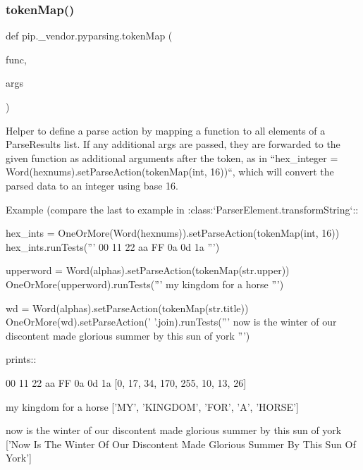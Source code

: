 \subsubsection{\texorpdfstring{token\+Map()}{tokenMap()}}
{\footnotesize\ttfamily def pip.\+\_\+vendor.\+pyparsing.\+token\+Map (\begin{DoxyParamCaption}\item[{}]{func,  }\item[{}]{args }\end{DoxyParamCaption})}

\begin{DoxyVerb}Helper to define a parse action by mapping a function to all
elements of a ParseResults list. If any additional args are passed,
they are forwarded to the given function as additional arguments
after the token, as in
``hex_integer = Word(hexnums).setParseAction(tokenMap(int, 16))``,
which will convert the parsed data to an integer using base 16.

Example (compare the last to example in :class:`ParserElement.transformString`::

    hex_ints = OneOrMore(Word(hexnums)).setParseAction(tokenMap(int, 16))
    hex_ints.runTests('''
        00 11 22 aa FF 0a 0d 1a
        ''')

    upperword = Word(alphas).setParseAction(tokenMap(str.upper))
    OneOrMore(upperword).runTests('''
        my kingdom for a horse
        ''')

    wd = Word(alphas).setParseAction(tokenMap(str.title))
    OneOrMore(wd).setParseAction(' '.join).runTests('''
        now is the winter of our discontent made glorious summer by this sun of york
        ''')

prints::

    00 11 22 aa FF 0a 0d 1a
    [0, 17, 34, 170, 255, 10, 13, 26]

    my kingdom for a horse
    ['MY', 'KINGDOM', 'FOR', 'A', 'HORSE']

    now is the winter of our discontent made glorious summer by this sun of york
    ['Now Is The Winter Of Our Discontent Made Glorious Summer By This Sun Of York']
\end{DoxyVerb}
 \mbox{\label{namespacepip_1_1__vendor_1_1pyparsing_a2f85833494e24217e5b6c2ed99869e13}} 
